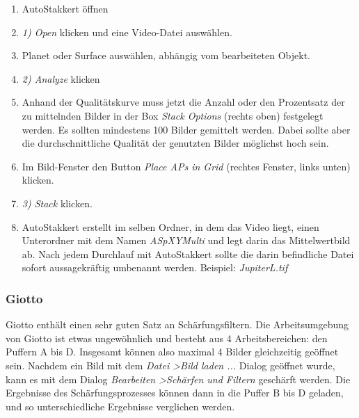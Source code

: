 \documentclass[10pt,a4paper,titlepage]{article}
\begin{document}
\begin{enumerate}
\item AutoStakkert öffnen
\item \textit{1) Open} klicken und eine Video-Datei auswählen.
\item Planet oder Surface auswählen, abhängig vom bearbeiteten Objekt.
\item \textit{2) Analyze} klicken
\item Anhand der Qualitätskurve muss jetzt die Anzahl oder den Prozentsatz der zu mittelnden Bilder in der Box \textit{Stack Options} (rechts oben) festgelegt werden. Es sollten mindestens 100 Bilder gemittelt werden. Dabei sollte aber die durchschnittliche Qualität der genutzten Bilder möglichst hoch sein.
\item Im Bild-Fenster den Button \textit{Place APs in Grid} (rechtes Fenster, links unten) klicken.
\item \textit{3) Stack} klicken.
\item AutoStakkert erstellt im selben Ordner, in dem das Video liegt, einen Unterordner mit dem Namen \textit{AS\textunderscore pXY\textunderscore Multi} und legt darin das Mittelwertbild ab. Nach jedem Durchlauf mit AutoStakkert sollte die darin befindliche Datei sofort aussagekräftig umbenannt werden. Beispiel: \textit{ Jupiter\textunderscore L.tif}
\end{enumerate}

\subsubsection{Giotto}
Giotto enthält einen sehr guten Satz an Schärfungsfiltern. Die Arbeitsumgebung von Giotto ist etwas ungewöhnlich und besteht aus 4 Arbeitsbereichen: den Puffern A bis D. Insgesamt können also maximal 4 Bilder gleichzeitig geöffnet sein. Nachdem ein Bild mit dem \textit{Datei \textgreater Bild laden ...} Dialog geöffnet wurde, kann es mit dem Dialog \textit{Bearbeiten \textgreater Schärfen und Filtern} geschärft werden. Die Ergebnisse des Schärfungsprozesses können dann in die Puffer B bis D geladen, und so unterschiedliche Ergebnisse verglichen werden.
\end{document}
